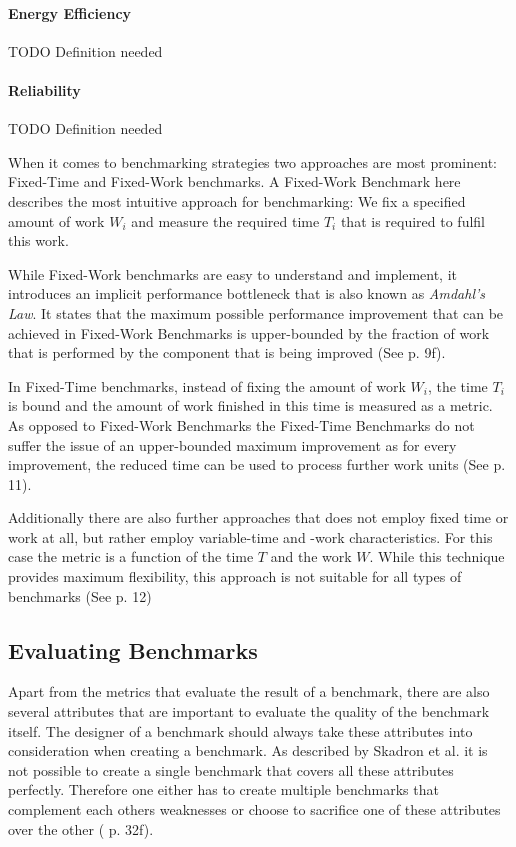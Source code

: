 \documentclass[	runningheads,
				a4paper]{llncs}
\begin{document}
\paragraph{Energy Efficiency} TODO Definition needed

\paragraph{Reliability} TODO Definition needed

When it comes to benchmarking strategies two approaches are most prominent: Fixed-Time and Fixed-Work benchmarks. A Fixed-Work Benchmark here describes the most intuitive approach for benchmarking: We fix a specified amount of work $W_i$ and measure the required time $T_i$ that is required to fulfil this work.

While Fixed-Work benchmarks are easy to understand and implement, it introduces an implicit performance bottleneck that is also known as \textit{Amdahl's Law}. It states that the maximum possible performance improvement that can be achieved in Fixed-Work Benchmarks is upper-bounded by the fraction of work that is performed by the component that is being improved (See \cite{Kounev} p. 9f).

In Fixed-Time benchmarks, instead of fixing the amount of work $W_i$, the time $T_i$ is bound and the amount of work finished in this time is measured as a metric. As opposed to Fixed-Work Benchmarks the Fixed-Time Benchmarks do not suffer the issue of an upper-bounded maximum improvement as for every improvement, the reduced time can be used to process further work units (See \cite{Kounev} p. 11).

Additionally there are also further approaches that does not employ fixed time or work at all, but rather employ variable-time and -work characteristics. For this case the metric is a function of the time $T$ and the work $W$. While this technique provides maximum flexibility, this approach is not suitable for all types of benchmarks (See \cite{Kounev} p. 12)

\subsection{Evaluating Benchmarks}

Apart from the metrics that evaluate the result of a benchmark, there are also several attributes that are important to evaluate the quality of the benchmark itself. The designer of a benchmark should always take these attributes into consideration when creating a benchmark. As described by Skadron et al. it is not possible to create a single benchmark that covers all these attributes perfectly. Therefore one either has to create multiple benchmarks that complement each others weaknesses or choose to sacrifice one of these attributes over the other (\cite{Skadron2003} p. 32f).
\end{document}
